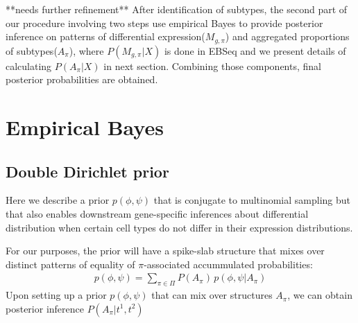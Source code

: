 \documentclass[11pt]{amsart}
\begin{document}
**needs further refinement**
After identification of subtypes, the second part of our procedure involving two steps use empirical Bayes to provide posterior inference on patterns of differential expression($M_{g,\pi}$) and aggregated proportions of subtypes($A_\pi$), where $P(M_{g,\pi} | X)$ is done in EBSeq\cite{ref:Leng} and we present details of calculating $P(A_\pi | X)$ in next section. Combining those components, final posterior probabilities are obtained. 


\section{Empirical Bayes}
\subsection{Double Dirichlet prior}

Here we describe a prior $p(\phi,\psi)$ that is conjugate to multinomial
sampling but that also enables downstream gene-specific inferences about
differential distribution when certain 
cell types do not differ in their expression
distributions.  


For our purposes, the prior will have a spike-slab structure that mixes
over distinct patterns of equality of $\pi$-associated
accummulated probabilities:
\begin{eqnarray*}
p(\phi,\psi) = \sum_{\pi \in \Pi} P(A_\pi) \, p(\phi,\psi| A_\pi )
\end{eqnarray*} 
Upon setting up a prior $p(\phi,\psi)$ that can mix over structures
$A_\pi$, we can obtain posterior inference $P(A_\pi | t^1, t^2)$
\end{document}
